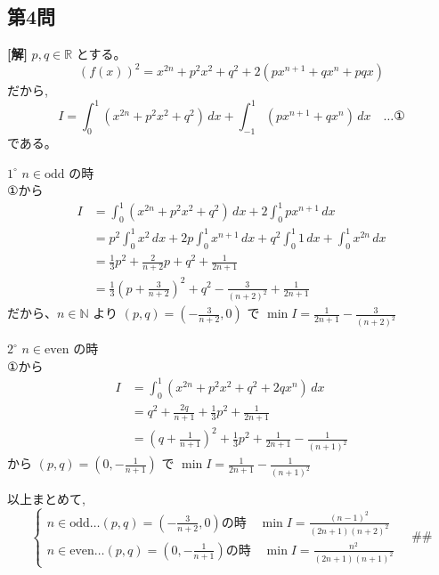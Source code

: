 \documentclass[../main.tex]{subfiles}
\begin{document}
\newpage

\subsection*{第4問}

\noindent
\textbf{[解]} $p,q \in \mathbb{R}$ とする。
\[
  (f(x))^2 = x^{2n} + p^2 x^2 + q^2 + 2(p x^{n+1} + q x^n + pq x)
\]
だから,
\[
  I = \int_0^1 (x^{2n} + p^2 x^2 + q^2) \, dx + \int_{-1}^1 (p x^{n+1} + q x^n) \, dx \quad \dots \text{①}
\]
である。

\bigskip
\noindent
$1^\circ$ $n \in \text{odd}$ の時\\
①から
\begin{align*}
  I &= \int_0^1 (x^{2n} + p^2 x^2 + q^2) \, dx + 2 \int_0^1 p x^{n+1} \, dx \\
  &= p^2 \int_0^1 x^2 \, dx + 2p \int_0^1 x^{n+1} \, dx + q^2 \int_0^1 1 \, dx + \int_0^1 x^{2n} \, dx \\
  &= \frac{1}{3} p^2 + \frac{2}{n+2} p + q^2 + \frac{1}{2n+1} \\
  &= \frac{1}{3} \left( p + \frac{3}{n+2} \right)^2 + q^2 - \frac{3}{(n+2)^2} + \frac{1}{2n+1}
\end{align*}
だから、$n \in \mathbb{N}$ より $(p,q) = \left(-\frac{3}{n+2}, 0\right)$ で $\min I = \frac{1}{2n+1} - \frac{3}{(n+2)^2}$

\bigskip
\noindent
$2^\circ$ $n \in \text{even}$ の時\\
①から
\begin{align*}
  I &= \int_0^1 (x^{2n} + p^2 x^2 + q^2 + 2q x^n) \, dx \\
  &= q^2 + \frac{2q}{n+1} + \frac{1}{3} p^2 + \frac{1}{2n+1} \\
  &= \left( q + \frac{1}{n+1} \right)^2 + \frac{1}{3} p^2 + \frac{1}{2n+1} - \frac{1}{(n+1)^2}
\end{align*}
から $(p,q) = \left(0, -\frac{1}{n+1}\right)$ で $\min I = \frac{1}{2n+1} - \frac{1}{(n+1)^2}$

\bigskip
\noindent
以上まとめて,
\[
  \begin{cases}
    n \in \text{odd} \dots (p,q) = \left(-\frac{3}{n+2}, 0\right) \text{の時} \quad \min I = \frac{(n-1)^2}{(2n+1)(n+2)^2} \\[1.5ex]
    n \in \text{even} \dots (p,q) = \left(0, -\frac{1}{n+1}\right) \text{の時} \quad \min I = \frac{n^2}{(2n+1)(n+1)^2}
  \end{cases}
  \quad \text{\#\#}
\]

\newpage
\end{document}
